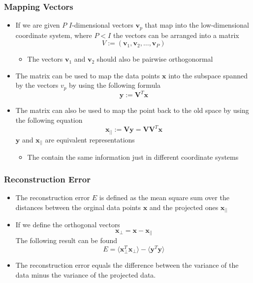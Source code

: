 \documentclass[a4, english]{article}
\begin{document}
\subsubsection{Mapping Vectors}
\begin{itemize}
	\item If we are given $P$ $I$-dimensional vectors $\pmb v_p$ that map into the low-dimensional coordinate system, where $P < I$ the vectors can be arranged into a matrix
  \begin{equation*}
    V := (\pmb v_1, \pmb v_2, \dots, \pmb v_P)
  \end{equation*}
  \begin{itemize}
  	\item The vectors $\pmb v_1$ and $\pmb v_2$ should also be pairwise orthogonormal
  \end{itemize}
  \item The matrix can be used to map the data points $\pmb x$ into the subspace spanned by the vectors $v_p$ by using the following formula
  \begin{equation*}
    \pmb y := \pmb V^T \pmb x
  \end{equation*}
  \item The matrix can also be used to map the point back to the old space by using the following equation
  \begin{equation*}
    \pmb x_{||} := \pmb V \pmb y = \pmb V \pmb V^T \pmb x
  \end{equation*}
  $\pmb y$ and $\pmb x_{||}$ are equivalent representations
  \begin{itemize}
    \item The contain the same information just in different coordinate systems 
  \end{itemize}
\end{itemize}

\subsubsection{Reconstruction Error}
\begin{itemize}
  \item The reconstruction error $E$ is defined as the mean square sum over the distances between the orginal data points $\pmb x$ and the projected ones $\pmb x_{||}$
  \item If we define the orthogonal vectors
\begin{equation*}
  \pmb x_\bot = \pmb x - \pmb x_{||}
\end{equation*}
  The following result can be found 
\begin{equation*}
  E = \langle \pmb x_{\bot}^T \pmb x_{\bot} \rangle - \langle \pmb y^T \pmb y \rangle 
\end{equation*}
\item The reconstruction error equals the difference between the variance of the data minus the variance of the projected data.
\end{itemize}
\end{document}
